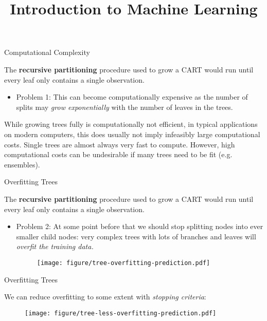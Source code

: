 \documentclass[11pt,compress,t,notes=noshow, xcolor=table]{beamer}
\title{Introduction to Machine Learning}
\institute{\href{https://compstat-lmu.github.io/lecture_i2ml/}{compstat-lmu.github.io/lecture\_i2ml}}
\date{}
\begin{document}
\sloppy

\begin{vbframe}{Computational Complexity}

The \textbf{recursive partitioning} procedure used to grow a CART would run until every leaf only contains a single observation. 
\begin{itemize}
\item Problem 1: This can become computationally expensive as the number of splits may \emph{grow exponentially} with the number of leaves in the trees.
\end{itemize}

While growing trees fully is computationally not efficient, in typical applications on modern computers, this does usually not imply infeasibly large computational costs.
Single trees are almost always very fast to compute.
However, high computational costs can be undesirable if many trees need to be fit (e.g. ensembles).

\end{vbframe}

\begin{vbframe}{Overfitting Trees}

The \textbf{recursive partitioning} procedure used to grow a CART would run until every leaf only contains a single observation. 
\begin{itemize}
\item Problem 2: At some point before that we should stop splitting nodes into ever smaller child nodes: very complex trees with lots of branches and leaves will \emph{overfit the training data.}

\begin{figure}
\centering
\texttt{[image: figure/tree-overfitting-prediction.pdf]}
\end{figure}

\end{itemize}

\end{vbframe}

\begin{vbframe}{Overfitting Trees}

We can reduce overfitting to some extent with \emph{stopping criteria}:
\vspace{0.25cm}

\begin{figure}
\centering
\texttt{[image: figure/tree-less-overfitting-prediction.pdf]}
\end{figure}

\end{vbframe}
\end{document}
